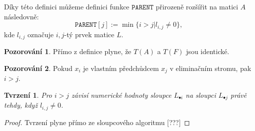 \documentclass[11pt,american,czech,oneside]{book}
\theoremstyle{plain}
\newtheorem{proposition}{Tvrzení}
\theoremstyle{definition}
\newtheorem{observation}{Pozorování}
\begin{document}
Díky této definici můžeme definici funkce $\texttt{PARENT}$ přirozeně rozšířit na matici $A$ následovně:
\[
    \texttt{PARENT}[j] := \min \{i > j | l_{i,j} \neq 0\},
\]
kde $l_{i,j}$ označuje $i,j$-tý prvek matice $L$.

\begin{observation}
Přímo z definice plyne, že $T(A)$ a $T(F)$ jsou identické.
\end{observation}

\begin{observation}
Pokud $x_i$ je vlastním předchůdcem $x_j$ v eliminačním stromu, pak $i > j$.
\end{observation}

\begin{proposition}
  Pro $i>j$ závisí numerické hodnoty sloupce $L_{\bullet i}$ na sloupci $L_{\bullet j}$ právě tehdy,
  když $l_{i,j} \neq 0$.
\end{proposition}
\begin{proof}
  Tvrzení plyne přímo ze sloupcového algoritmu [???]
\end{proof}



\newpage


\end{document}
